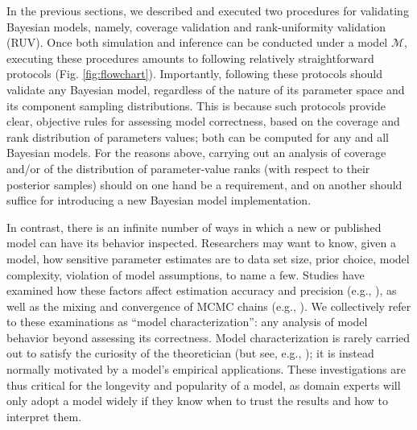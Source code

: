 \documentclass[oneside]{article}
\begin{document}
In the previous sections, we described and executed two procedures for validating Bayesian models, namely, coverage validation and rank-uniformity validation (RUV).
Once both simulation and inference can be conducted under a model $\mathcal{M}$, executing these procedures amounts to following relatively straightforward protocols (Fig. \ref{fig:flowchart}).
Importantly, following these protocols should validate any Bayesian model, regardless of the nature of its parameter space and its component sampling distributions.
This is because such protocols provide clear, objective rules for
assessing model correctness, based on the coverage and rank
distribution of parameters values; both can be computed for any and all Bayesian models.
For the reasons above, carrying out an analysis of coverage and/or of the distribution of parameter-value ranks (with respect to their posterior samples) should on one hand be a requirement, and on another should suffice for introducing a new Bayesian model implementation.

In contrast, there is an infinite number of ways in which a new or published model can have its behavior inspected.
Researchers may want to know, given a model, how sensitive parameter estimates are to data set size, prior choice, model complexity, violation of model assumptions, to name a few.
Studies have examined how these factors affect estimation accuracy and precision (e.g., \citealp{zhang23,luo23}), as well as the mixing and convergence of MCMC chains (e.g., \citealp{nylander04,zhang23}).
We collectively refer to these examinations as ``model characterization'': any analysis of model behavior beyond assessing its correctness.
Model characterization is rarely carried out to satisfy the curiosity of the theoretician (but see, e.g., \citealp{tuffley97,steel20}); it is instead normally motivated by a model's empirical applications.
These investigations are thus critical for the longevity and popularity of a model, as domain experts will only adopt a model widely if they know when to trust the results and how to interpret them.
\end{document}

